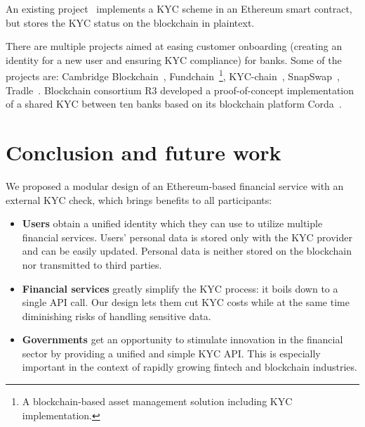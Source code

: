 An existing project~\cite{Ohtamaa2016} implements a KYC scheme in an Ethereum smart contract, but stores the KYC status on the blockchain in plaintext.

There are multiple projects aimed at easing customer onboarding (creating an identity for a new user and ensuring KYC compliance) for banks.
Some of the projects are: Cambridge Blockchain~\cite{CambridgeBlockchain}, Fundchain~\cite{Fundchain}\footnote{A blockchain-based asset management solution including KYC implementation.}, KYC-chain~\cite{KycChain}, SnapSwap~\cite{SnapSwap}, Tradle~\cite{Tradle}.
Blockchain consortium R3 developed a proof-of-concept implementation of a shared KYC between ten banks based on its blockchain platform Corda~\cite{Allison2016}.




\section{Conclusion and future work}

We proposed a modular design of an Ethereum-based financial service with an external KYC check, which brings benefits to all participants:

\begin{itemize}
	\item \textbf{Users} obtain a unified identity which they can use to utilize multiple financial services.
	Users' personal data is stored only with the KYC provider and can be easily updated.
	Personal data is neither stored on the blockchain nor transmitted to third parties.
	\item \textbf{Financial services} greatly simplify the KYC process: it boils down to a single API call.
	Our design lets them cut KYC costs while at the same time diminishing risks of handling sensitive data.
	\item \textbf{Governments} get an opportunity to stimulate innovation in the financial sector by providing a unified and simple KYC API.
	This is especially important in the context of rapidly growing fintech and blockchain industries.
\end{itemize}

